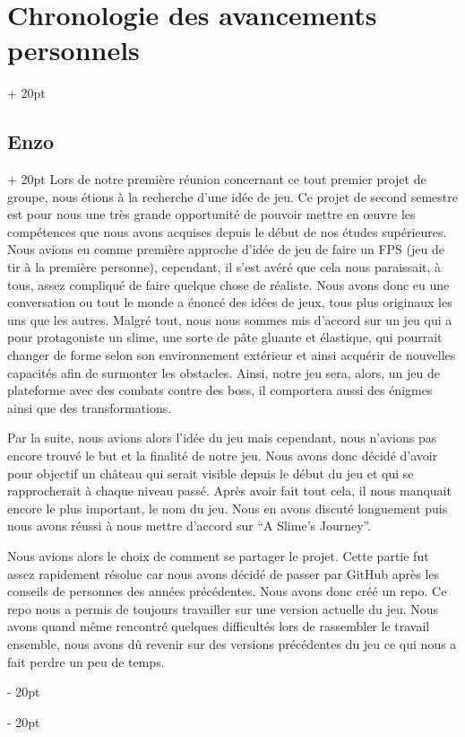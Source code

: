 \documentclass[a4paper, 12pt, twoside]{article}
\newcommand{\ind}[1][20pt]{\advance\leftskip + #1}
\newcommand{\deind}[1][20pt]{\advance\leftskip - #1}
\newenvironment{indt}[2][20pt]{#2 \par \ind[#1]}{\par \deind} %
\begin{document}
    \begin{indt}{\section{Chronologie des avancements personnels}}
        \begin{indt}{\subsection{Enzo}}
            Lors de notre première réunion concernant ce tout premier projet de groupe, nous étions à la recherche d'une idée de jeu. Ce projet de second semestre est pour nous une très grande opportunité de pouvoir mettre en œuvre les compétences que nous avons acquises depuis le début de nos études supérieures. Nous avions eu comme première approche d'idée  de jeu de faire un FPS (jeu de tir à la première personne), cependant, il s'est avéré que cela nous paraissait, à tous, assez compliqué de faire quelque chose de réaliste. Nous avons donc eu une conversation ou tout le monde a énoncé des idées de jeux, tous plus originaux les uns que les autres. Malgré tout, nous nous sommes mis d'accord sur un jeu qui a pour protagoniste un slime, une sorte de pâte gluante et élastique, qui pourrait changer de forme selon son environnement extérieur et ainsi acquérir de nouvelles capacités afin de surmonter les obstacles. Ainsi, notre jeu sera, alors, un jeu de plateforme avec des combats contre des boss, il comportera aussi des énigmes ainsi que des transformations.

            Par la suite, nous avions alors l'idée du jeu mais cependant, nous n'avions pas encore trouvé le but et la finalité de notre jeu. Nous avons donc décidé d'avoir pour objectif un château qui serait visible depuis le début du jeu et qui se rapprocherait à chaque niveau passé. Après avoir fait tout cela, il nous manquait encore le plus important, le nom du jeu. Nous en avons discuté longuement puis nous avons réussi à nous mettre d'accord sur “A Slime's Journey”.
        	
            Nous avions alors le choix de comment se partager le projet. Cette partie fut assez rapidement résolue car nous avons décidé de passer par GitHub après les conseils de personnes des années précédentes. Nous avons donc créé un repo. Ce repo nous a permis de toujours travailler sur une version actuelle du jeu. Nous avons quand même rencontré quelques difficultés lors de rassembler le travail ensemble, nous avons dû revenir sur des versions précédentes du jeu ce qui nous a fait perdre un peu de temps.
        	

\end{indt}
\end{indt}
\end{document}
